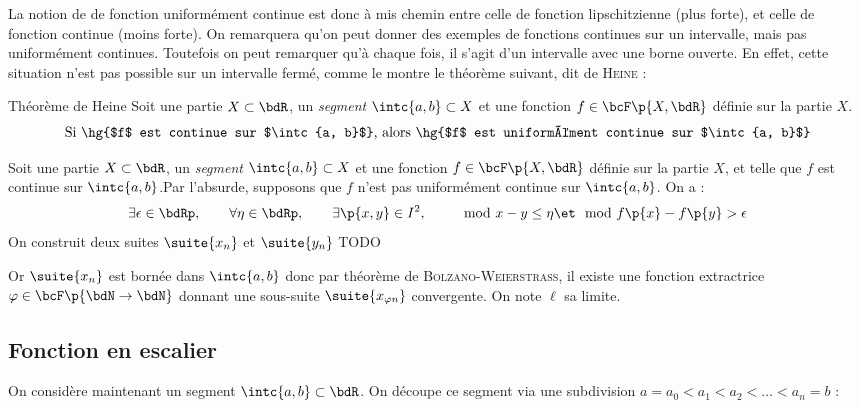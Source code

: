 \documentclass[a4paper,french,bookmarks]{article}
\begin{document}
    La notion de de fonction uniformément continue est donc à mis chemin entre celle de fonction lipschitzienne (plus forte), et celle de fonction continue (moins forte). On remarquera qu'on peut donner des exemples de fonctions continues sur un intervalle, mais pas uniformément continues. Toutefois on peut remarquer qu'à chaque fois, il s'agit d'un intervalle avec une borne ouverte. En effet, cette situation n'est pas possible sur un intervalle fermé, comme le montre le théorème suivant, dit de \textsc{Heine} :
    
    \begin{theorem}{Théorème de Heine}
        Soit une partie $X \subset \bdR$, un \textit{segment} $\intc{a,b} \subset X$ et une fonction $f \in \bcF\p{X, \bdR}$ définie sur la partie $X$.
        \[ \text{Si \hg{$f$ est continue sur $\intc{a, b}$}, alors \hg{$f$ est uniformément continue sur $\intc{a, b}$}} \]
    \end{theorem}
    \begin{nproof}
        Soit une partie $X \subset \bdR$, un \textit{segment} $\intc{a,b} \subset X$ et une fonction $f \in \bcF\p{X, \bdR}$ définie sur la partie $X$, et telle que $f$ est continue sur $\intc{a, b}$.Par l'absurde, supposons que $f$ n'est pas uniformément continue sur $\intc{a, b}$. On a :
        \[ \exists \epsilon \in \bdRp,\qquad \forall \eta \in \bdRp,\qquad \exists \p{x, y} \in I^2,\qquad \mod{x - y} \leq \eta \et \mod{f\p{x} - f\p{y}} > \epsilon\]
        On construit deux suites $\suite{x_n}$ et $\suite{y_n}$ TODO
        
        Or $\suite{x_n}$ est bornée dans $\intc{a, b}$ donc par théorème de \textsc{Bolzano}-\textsc{Weierstrass}, il existe une fonction extractrice $\varphi \in \bcF\p{\bdN \to \bdN}$ donnant une sous-suite $\suite{x_{\varphi{n}}}$ convergente. On note $\ell$ sa limite.
    \end{nproof}
    
    \subsection{Fonction en escalier}
    
    On considère maintenant un segment $\intc{a, b} \subset \bdR$. On découpe ce segment via une subdivision $a = a_0 < a_1 < a_2 < \dots < a_n = b$ :
    
    \begin{center}
    \end{center}
\end{document}
